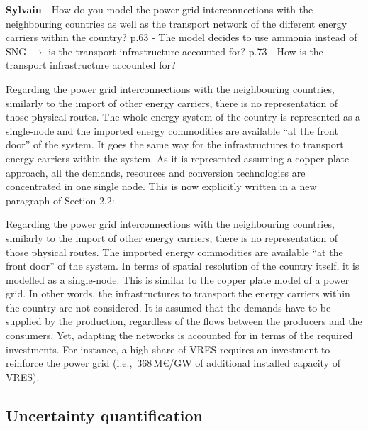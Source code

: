 \documentclass[12pt,a4paper]{article}
\def\ie{i.e.,\ }
\begin{document}
\begin{mdframed}[style=comment] %
{\color{purple} \textbf{Sylvain}} - How do you model the power grid interconnections with the neighbouring countries as well as the transport network of the different energy carriers within the country? p.63 - The model decides to use ammonia instead of SNG $\rightarrow$ is the transport infrastructure accounted for? p.73 - How is the transport infrastructure accounted for?
\end{mdframed}

\noindent Regarding the power grid interconnections with the neighbouring countries, similarly to the import of other energy carriers, there is no representation of those physical routes. The whole-energy system of the country is represented as a single-node and the imported energy commodities are available ``at the front door'' of the system. It goes the same way for the infrastructures to transport energy carriers within the system. As it is represented assuming a copper-plate approach, all the demands, resources and conversion technologies are concentrated in one single node. This is now explicitly written {\color{blue}in a new paragraph of Section 2.2}:

\begin{mdframed}[style=manuscript] %
Regarding the power grid interconnections with the neighbouring countries, similarly to the import of other energy carriers, there is no representation of those physical routes. The imported energy commodities are available ``at the front door'' of the system.  In terms of spatial resolution of the country itself, it is modelled as a single-node. This is similar to the copper plate model of a power grid. In other words, the infrastructures to transport the energy carriers within the country are not considered.  It is assumed that the demands have to be supplied by the production, regardless of the flows between the producers and the consumers. Yet, adapting the networks is accounted for in terms of the required investments. For instance, a high share of VRES requires an investment to reinforce the power grid (\ie 368\,M€/GW of additional installed capacity of VRES). 
\end{mdframed}

\subsection{Uncertainty quantification}
\label{methodo_UQ}
\end{document}
